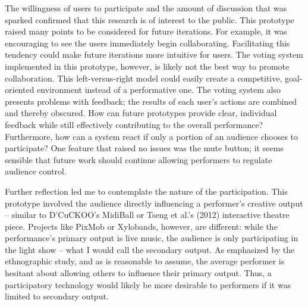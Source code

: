 The willingness of users to participate and the amount of discussion that was sparked confirmed that this research is of interest to the public. This prototype raised many points to be considered for future iterations. For example, it was encouraging to see the users immediately begin collaborating. Facilitating this tendency could make future iterations more intuitive for users. The voting system implemented in this prototype, however, is likely not the best way to promote collaboration. This left-versus-right model could easily create a competitive, goal-oriented environment instead of a performative one. The voting system also presents problems with feedback; the results of each user's actions are combined and thereby obscured. How can future prototypes provide clear, individual feedback while still effectively contributing to the overall performance? Furthermore, how can a system react if only a portion of an audience chooses to participate? One feature that raised no issues was the mute button; it seems sensible that future work should continue allowing performers to regulate audience control.

Further reflection led me to contemplate the nature of the participation. This prototype involved the audience directly influencing a performer's creative output -- similar to D'CuCKOO's MidiBall or Tseng et al.'s (2012) interactive theatre piece. Projects like PixMob or Xylobands, however, are different: while the performance's primary output is live music, the audience is only participating in the light show -- what I would call the secondary output. As emphasized by the ethnographic study, and as is reasonable to assume, the average performer is hesitant about allowing others to influence their primary output. Thus, a participatory technology would likely be more desirable to performers if it was limited to secondary output.


